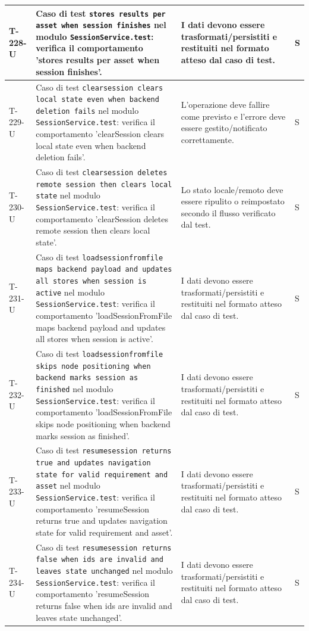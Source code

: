 \documentclass[a4paper,12pt]{article}
\begin{document}
{{\begin{longtable}{|>{\RaggedRight\arraybackslash}p{1.55cm}|>{\RaggedRight\arraybackslash}p{8.0cm}|>{\RaggedRight\arraybackslash}p{4.6cm}|>{\RaggedRight\arraybackslash}p{1.2cm}|}
        T-228-U & Caso di test \texttt{stores results per asset when session finishes} nel modulo \texttt{SessionService.test}: verifica il comportamento 'stores results per asset when session finishes'. & I dati devono essere trasformati/persistiti e restituiti nel formato atteso dal caso di test. & S \\
        \hline
        T-229-U & Caso di test \texttt{clearsession clears local state even when backend deletion fails} nel modulo \texttt{SessionService.test}: verifica il comportamento 'clearSession clears local state even when backend deletion fails'. & L'operazione deve fallire come previsto e l'errore deve essere gestito/notificato correttamente. & S \\
        \hline
        T-230-U & Caso di test \texttt{clearsession deletes remote session then clears local state} nel modulo \texttt{SessionService.test}: verifica il comportamento 'clearSession deletes remote session then clears local state'. & Lo stato locale/remoto deve essere ripulito o reimpostato secondo il flusso verificato dal test. & S \\
        \hline
        T-231-U & Caso di test \texttt{loadsessionfromfile maps backend payload and updates all stores when session is active} nel modulo \texttt{SessionService.test}: verifica il comportamento 'loadSessionFromFile maps backend payload and updates all stores when session is active'. & I dati devono essere trasformati/persistiti e restituiti nel formato atteso dal caso di test. & S \\
        \hline
        T-232-U & Caso di test \texttt{loadsessionfromfile skips node positioning when backend marks session as finished} nel modulo \texttt{SessionService.test}: verifica il comportamento 'loadSessionFromFile skips node positioning when backend marks session as finished'. & I dati devono essere trasformati/persistiti e restituiti nel formato atteso dal caso di test. & S \\
        \hline
        T-233-U & Caso di test \texttt{resumesession returns true and updates navigation state for valid requirement and asset} nel modulo \texttt{SessionService.test}: verifica il comportamento 'resumeSession returns true and updates navigation state for valid requirement and asset'. & I dati devono essere trasformati/persistiti e restituiti nel formato atteso dal caso di test. & S \\
        \hline
        T-234-U & Caso di test \texttt{resumesession returns false when ids are invalid and leaves state unchanged} nel modulo \texttt{SessionService.test}: verifica il comportamento 'resumeSession returns false when ids are invalid and leaves state unchanged'. & I dati devono essere trasformati/persistiti e restituiti nel formato atteso dal caso di test. & S \\

\end{longtable}}}
\end{document}
